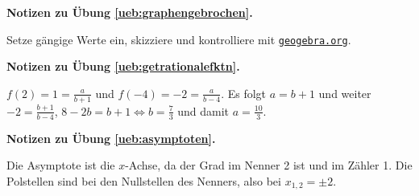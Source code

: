 \documentclass[%
11pt,%
twoside,%
titlepage,%
swissgerman,%
headsepline%
]{scrartcl}
\newcommand{\faReturnGray}{\textcolor{gray}{\faMailReply}} %
\newcommand{\geogebralink}{\href{https://www.geogebra.org/calculator}{\texttt{geogebra.org}}}
\theoremstyle{definition}
\theoremstyle{plain}
\newcommand{\concatueb}[1]{ueb:#1}%
\newcommand{\concatlsg}[1]{lsg:#1}%
\newenvironment{lsg}[1]{%
    \par\noindent\textbf{Notizen zu Übung \ref{\concatueb{#1}}.}%
    \label{\concatlsg{#1}} %
    \hfill\hyperref[\concatueb{#1}]{\faReturnGray}\par %
}{%
    \par%
}
\begin{document}
\clearpage

\begin{lsg}{graphengebrochen}
    Setze gängige Werte ein, skizziere und kontrolliere mit \geogebralink.
\end{lsg}

\begin{lsg}{getrationalefktn}
$f(2)=1=\frac{a}{b+1}$ und $f(-4)=-2=\frac{a}{b-4}$. Es folgt $a=b+1$ und weiter $-2=\frac{b+1}{b-4}$, $8-2b=b+1\Leftrightarrow b=\frac{7}{3}$ und damit $a=\frac{10}{3}$.
\end{lsg}

\begin{lsg}{asymptoten}
    Die Asymptote ist die $x$-Achse, da der Grad im Nenner 2 ist und im Zähler 1. Die Polstellen sind bei den Nullstellen des Nenners, also bei $x_{1,2}=\pm2$.
\end{lsg}

\clearpage

\listoffigures
%
%
\end{document}
